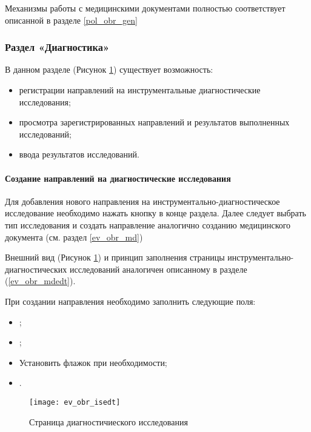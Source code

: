 {Механизмы работы с медицинскими документами полностью соответствует описанной в разделе \ref{pol_obr_gen}

\subsubsection{Раздел «Диагностика»} \label{ev_obr_is}

{
В данном разделе (Рисунок \ref{img_ev_obr_isedt}) существует возможность:
\begin{itemize}
 \item регистрации направлений на инструментальные диагностические исследования;
 \item просмотра зарегистрированных направлений и результатов выполненных исследований;
 \item ввода результатов исследований.
\end{itemize}
 
\paragraph{Создание направлений на диагностические исследования}

Для добавления нового направления на инструментально-диагностическое исследование необходимо нажать кнопку   в конце раздела. Далее следует выбрать тип исследования и создать направление аналогично созданию медицинского документа (см. раздел \ref{ev_obr_md})

Внешний вид (Рисунок \ref{img_ev_obr_isedt}) и принцип заполнения страницы инструментально-диагностических исследований аналогичен описанному в разделе (\ref{ev_obr_mdedt}).

При создании направления необходимо заполнить следующие поля:

\begin{itemize}
 \item {};
 \item {};
 \item Установить флажок  при необходимости;
 \item {}.
\end{itemize}

}{}

 \begin{figure}[ht]\centering
   \texttt{[image: ev\_obr\_isedt]}
   \caption{Страница диагностичиеского исследования}
   \label{img_ev_obr_isedt}
 \end{figure}  

}
